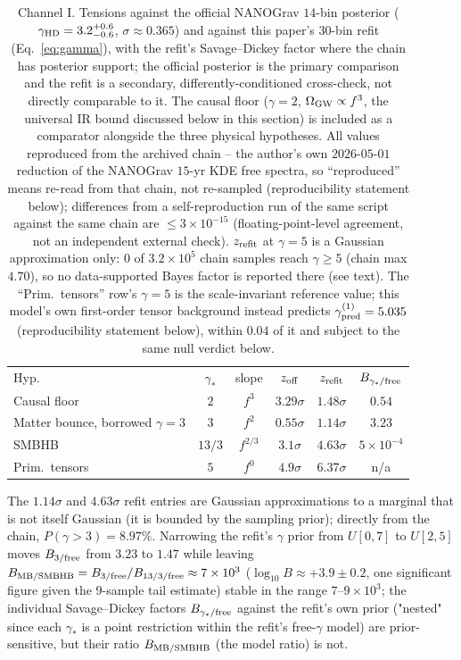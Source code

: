 \documentclass[aps,prd,twocolumn,superscriptaddress,nofootinbib,longbibliography]{revtex4-2}
\newcommand{\OmGW}{\Omega_{\rm GW}}
\begin{document}
\begin{table}[t]
\caption{\label{tab:pta}Channel I. Tensions against the official NANOGrav
$14$-bin posterior ($\gamma_{\rm HD}=3.2^{+0.6}_{-0.6}$, $\sigma\approx0.365$)
and against this paper's $30$-bin refit (Eq.~\eqref{eq:gamma}), with the
refit's Savage--Dickey factor where the chain has posterior support; the
official posterior is the primary comparison and the refit is a secondary,
differently-conditioned cross-check, not directly comparable to it. The
causal floor ($\gamma=2$, $\OmGW\propto f^3$, the universal IR bound
discussed below in this section) is included as a comparator alongside
the three physical hypotheses. All
values reproduced from the archived chain -- the author's own $2026$-$05$-$01$
reduction of the NANOGrav $15$-yr KDE free spectra, so ``reproduced'' means
re-read from that chain, not re-sampled (reproducibility statement below);
differences from a self-reproduction run of the same script against the same chain are $\le3\times10^{-15}$ (floating-point-level agreement, not an independent external check). $z_{\rm refit}$
at $\gamma=5$ is a Gaussian approximation only: $0$ of $3.2\times10^5$ chain
samples reach $\gamma\ge5$ (chain max $4.70$), so no data-supported Bayes
factor is reported there (see text). The ``Prim.\ tensors'' row's $\gamma=5$
is the scale-invariant reference value; this model's own first-order tensor
background instead predicts $\gamma_{\rm pred}^{(1)}=5.035$
(reproducibility statement below), within $0.04$ of it and
subject to the same null verdict below.}
\begin{ruledtabular}
\scriptsize
\begin{tabular}{lccccc}
Hyp. & $\gamma_*$ & slope & $z_{\rm off}$ & $z_{\rm refit}$ & $B_{\gamma_*/{\rm free}}$ \\
\colrule
Causal floor  & $2$    & $f^{3}$   & $3.29\sigma$ & $1.48\sigma$ & $0.54$ \\
Matter bounce, borrowed $\gamma=3$ & $3$    & $f^{2}$   & $0.55\sigma$ & $1.14\sigma$ & $3.23$ \\
SMBHB         & $13/3$ & $f^{2/3}$ & $3.1\sigma$  & $4.63\sigma$ & $5\times10^{-4}$ \\
Prim.\ tensors& $5$    & $f^{0}$   & $4.9\sigma$  & $6.37\sigma$ & n/a \\
\end{tabular}
\end{ruledtabular}
\end{table}

The $1.14\sigma$ and $4.63\sigma$ refit entries are Gaussian approximations
to a marginal that is not itself Gaussian (it is bounded by the sampling
prior); directly from the chain, $P(\gamma>3)=8.97\%$. Narrowing the refit's
$\gamma$ prior from $U[0,7]$ to $U[2,5]$ moves
$B_{3/{\rm free}}$ from $3.23$ to $1.47$ while leaving
$B_{\rm MB/SMBHB}=B_{3/{\rm free}}/B_{13/3/{\rm free}}\approx7\times10^3$
($\log_{10}B\approx+3.9\pm0.2$, one significant figure given the $9$-sample
tail estimate) stable in the range $7$--$9\times10^3$; the individual
Savage--Dickey factors $B_{\gamma_*/{\rm free}}$ against the refit's own
prior ("nested" since each $\gamma_*$ is a point restriction within the
refit's free-$\gamma$ model) are prior-sensitive, but their ratio
$B_{\rm MB/SMBHB}$ (the model ratio) is not.
\end{document}
